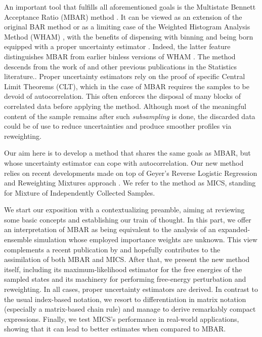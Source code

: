 \documentclass[
    journal=jctcce,
    layout=twocolumn
]{achemso}
\begin{document}
An important tool that fulfills all aforementioned goals is the Multistate Bennett Acceptance Ratio (MBAR) method \cite{Shirts_2008}. It can be viewed as an extension of the original BAR method \cite{Bennett_1976} or as a limiting case of the Weighted Histogram Analysis Method (WHAM) \cite{Ferrenberg_1989, *Kumar_1992}, with the benefits of dispensing with binning \cite{Tan_2012} and being born equipped with a proper uncertainty estimator \cite{Shirts_2008}. Indeed, the latter feature distinguishes MBAR from earlier binless versions of WHAM \cite{Bartels_2000, Souaille_2001}. The method descends from the work of \citeauthor{Kong_2003} \cite{Kong_2003} and other previous publications in the Statistics literature.\cite{Vardi_1985, Gill_1988, Geyer_1994, Lindsay_1995, Meng_1996}. Proper uncertainty estimators rely on the proof of specific Central Limit Theorems (CLT), which in the case of MBAR requires the samples to be devoid of autocorrelation. This often enforces the disposal of many blocks of correlated data before applying the method. Although most of the meaningful content of the sample remains after such \textit{subsampling} is done, the discarded data could be of use to reduce uncertainties and produce smoother profiles via reweighting.

Our aim here is to develop a method that shares the same goals as MBAR, but whose uncertainty estimator can cope with autocorrelation. Our new method relies on recent developments \cite{Flegal_2010, Buta_2010, Buta_2011, Doss_2014, Vats_2015, *Vats_2018, Tan_2015, Roy_2018} made on top of Geyer's Reverse Logistic Regression and Reweighting Mixtures  approach \cite{Geyer_1994}. We refer to the method as MICS, standing for Mixture of Independently Collected Samples.

We start our exposition with a contextualizing preamble, aiming at reviewing some basic concepts and establishing our train of thought. In this part, we offer an interpretation of MBAR as being equivalent to the analysis of an expanded-ensemble simulation \cite{Lyubartsev_1992} whose employed importance weights are unknown. This view complements a recent publication by \citeauthor{Shirts_2017} \cite{Shirts_2017} and hopefully contributes to the assimilation of both MBAR and MICS. After that, we present the new method itself, including its maximum-likelihood estimator for the free energies of the sampled states and its machinery for performing free-energy perturbation and reweighting. In all cases, proper uncertainty estimators are derived. In contrast to the usual index-based notation, we resort to differentiation in matrix notation (especially a matrix-based chain rule) and manage to derive remarkably compact expressions. Finally, we test MICS's performance in real-world applications, showing that it can lead to better estimates when compared to MBAR.
\end{document}
